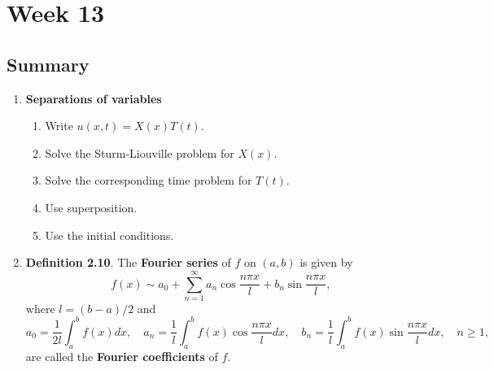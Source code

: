 \chapter{Week 13}
\setcounter{weekpage}{1}
\thispagestyle{plainweek}

\section{Summary}

\begin{enumerate}


\item \textbf{Separations of variables}
\begin{enumerate}[1)]
\item Write $u(x, t) = X(x)T (t)$.
\item Solve the Sturm-Liouville problem for $X(x)$.
\item Solve the corresponding time problem for $T (t)$.
\item Use superposition.
\item Use the initial conditions.
\end{enumerate}

\item \textbf{Definition 2.10}.  The \textbf{Fourier series}  of $f$ on $(a, b)$ is given by
\[f(x) \sim a_{0}+\sum_{n=1}^{\infty}a_{n}\cos \frac{n\pi x}{l} + b_{n}\sin \frac{n\pi x}{l},\]
where $l=(b-a)/2$ and
\[a_{0} = \frac{1}{2l}\int_{a}^{b}f(x)dx, \quad a_{n} = \frac{1}{l}\int_{a}^{b}f(x)\cos\frac{n\pi x}{l}dx,\quad b_{n} = \frac{1}{l}\int_{a}^{b}f(x)\sin\frac{n\pi x}{l}dx,\quad n\geq 1,\]
are called the \textbf{Fourier coefficients} of $f$.





\end{enumerate}
